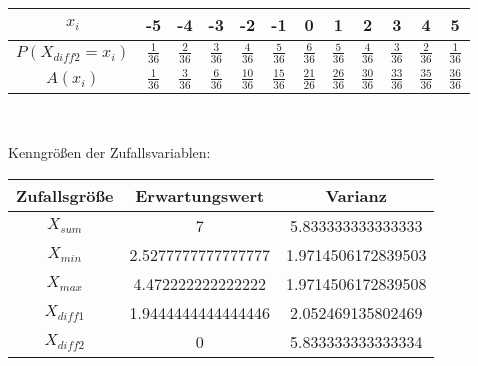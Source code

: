 \newpage
\begin{center}
\begin{tabular}{|c|c|c|c|c|c|c|c|c|c|c|c|}
\hline 
$x_i$ & -5 & -4 & -3 & -2 & -1 & 0 & 1 & 2 & 3 & 4 & 5 \\ 
\hline 
$P(X_{diff2}=x_i)$ & $\frac{1}{36}$ & $\frac{2}{36}$ & $\frac{3}{36}$ & $\frac{4}{36}$ & $\frac{5}{36}$ & $\frac{6}{36}$ & $\frac{5}{36}$ & $\frac{4}{36}$ & $\frac{3}{36}$ & $\frac{2}{36}$ & $\frac{1}{36}$ \\ 
\hline 
$A(x_i)$ & $\frac{1}{36}$ & $\frac{3}{36}$ & $\frac{6}{36}$ & $\frac{10}{36}$ & $\frac{15}{36}$ & $\frac{21}{26}$ & $\frac{26}{36}$ & $\frac{30}{36}$ & $\frac{33}{36}$ & $\frac{35}{36}$ & $\frac{36}{36}$\\ 
\hline 
\end{tabular}
\vspace{0.5cm}\\


\end{center}

\newpage
Kenngrößen der Zufallsvariablen:

\begin{center}
\begin{tabular}{|c|c|c|}
\hline 
Zufallsgröße & Erwartungswert & Varianz \\ 
\hline 
$X_{sum}$ & 7 & 5.833333333333333 \\ 
\hline 
$X_{min}$ & 2.5277777777777777 & 1.9714506172839503
 \\ 
\hline 
$X_{max}$ & 4.472222222222222 & 1.9714506172839508
 \\ 
\hline 
$X_{diff1}$ & 1.9444444444444446 & 2.052469135802469 \\ 
\hline 
$X_{diff2}$ & 0 & 5.833333333333334 \\ 
\hline 
\end{tabular} 
\end{center}

